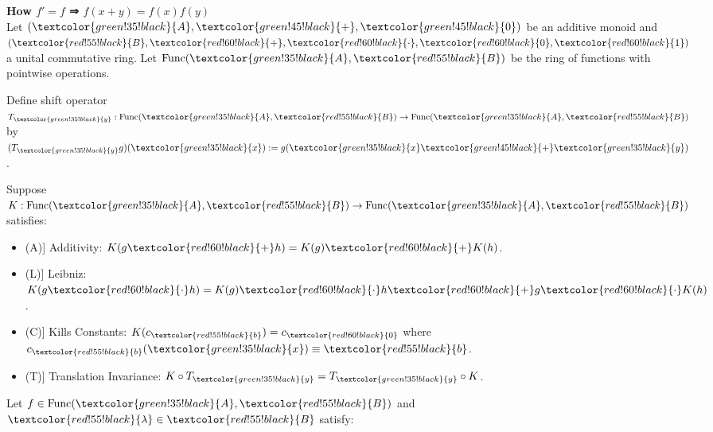 \newcommand{\A}[1]{\textcolor{green!35!black}{#1}}          %
\newcommand{\B}[1]{\textcolor{red!55!black}{#1}} %
\newcommand{\OpA}[1]{\textcolor{green!45!black}{#1}}        %
\newcommand{\OpB}[1]{\textcolor{red!60!black}{#1}} %
\newcommand{\axlabel}[1]{\makebox[1.2em][l]{(#1)}}

\begin{technical}
{\Large\textbf{How \( f' = f \) ⇒ \( f(x+y) = f(x)f(y) \)}}\\[0.25em]

Let \( (\A{A}, \OpA{+}, \OpA{0}) \) be an additive monoid and \( (\B{B}, \OpB{+}, \OpB{\cdot}, \OpB{0}, \OpB{1}) \) a unital commutative ring. Let \( \mathrm{Func}(\A{A}, \B{B}) \) be the ring of functions with pointwise operations.

Define shift operator \( T_{\A{y}}: \mathrm{Func}(\A{A}, \B{B}) \to \mathrm{Func}(\A{A}, \B{B}) \) by \( (T_{\A{y}}g)(\A{x}) := g(\A{x} \OpA{+} \A{y}) \).

Suppose \( K: \mathrm{Func}(\A{A}, \B{B}) \to \mathrm{Func}(\A{A}, \B{B}) \) satisfies:

\vspace{-0.25em}
\begin{itemize}[leftmargin=2.5em,labelwidth=1.5em,labelsep=0.5em,topsep=0pt,itemsep=0pt]
  \item[\axlabel{A}] Additivity: \( K(g \OpB{+} h) = K(g) \OpB{+} K(h) \).
  \item[\axlabel{L}] Leibniz: \( K(g \OpB{\cdot} h) = K(g) \OpB{\cdot} h \OpB{+} g \OpB{\cdot} K(h) \).
  \item[\axlabel{C}] Kills Constants: \( K(c_{\B{b}}) = c_{\OpB{0}} \) where \( c_{\B{b}}(\A{x}) \equiv \B{b} \).
  \item[\axlabel{T}] Translation Invariance: \( K \circ T_{\A{y}} = T_{\A{y}} \circ K \).
\end{itemize}

Let \( f \in \mathrm{Func}(\A{A}, \B{B}) \) and \( \B{\lambda} \in \B{B} \) satisfy:


\end{technical}
